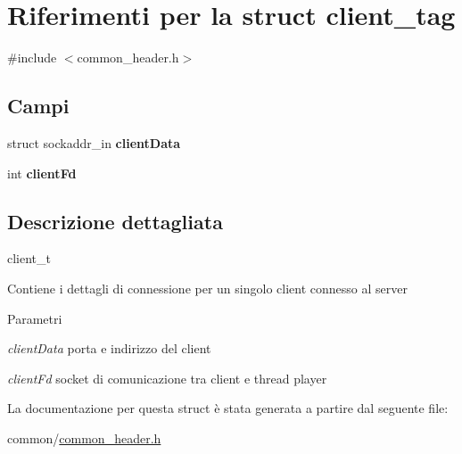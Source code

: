 \hypertarget{structclient__tag}{
\section{Riferimenti per la struct client\_\-tag}
\label{structclient__tag}
}


{\ttfamily \#include $<$common\_\-header.h$>$}

\subsection*{Campi}
\begin{DoxyCompactItemize}
\item 
\hypertarget{structclient__tag_accce00145c84843553fa5ed891333e96}{
struct sockaddr\_\-in {\bfseries clientData}}
\label{structclient__tag_accce00145c84843553fa5ed891333e96}

\item 
\hypertarget{structclient__tag_abea56515cd74fc46141106ea4d886706}{
int {\bfseries clientFd}}
\label{structclient__tag_abea56515cd74fc46141106ea4d886706}

\end{DoxyCompactItemize}


\subsection{Descrizione dettagliata}
client\_\-t

Contiene i dettagli di connessione per un singolo client connesso al server


\begin{DoxyParams}{Parametri}
\item[{\em clientData}]porta e indirizzo del client \item[{\em clientFd}]socket di comunicazione tra client e thread player \end{DoxyParams}


La documentazione per questa struct è stata generata a partire dal seguente file:\begin{DoxyCompactItemize}
\item 
common/\hyperlink{common__header_8h}{common\_\-header.h}\end{DoxyCompactItemize}

